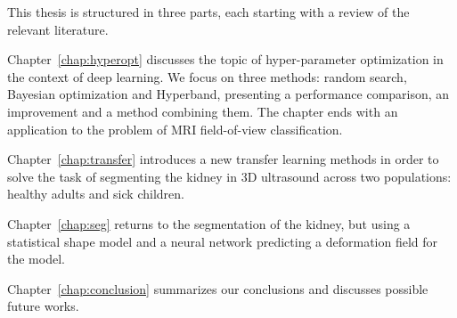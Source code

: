This thesis is structured in three parts, each starting with a review of the relevant literature.

Chapter~\ref{chap:hyperopt} discusses the topic of hyper-parameter optimization in the context of deep learning. We focus on three methods: random search, Bayesian optimization and Hyperband, presenting a performance comparison, an improvement and a method combining them. The chapter ends with an application to the problem of MRI field-of-view classification.

Chapter~\ref{chap:transfer} introduces a new transfer learning methods in order to solve the task of segmenting the kidney in 3D ultrasound across two populations: healthy adults and sick children.

Chapter~\ref{chap:seg} returns to the segmentation of the kidney, but using a statistical shape model and a neural network predicting a deformation field for the model.

Chapter~\ref{chap:conclusion} summarizes our conclusions and discusses possible future works.
